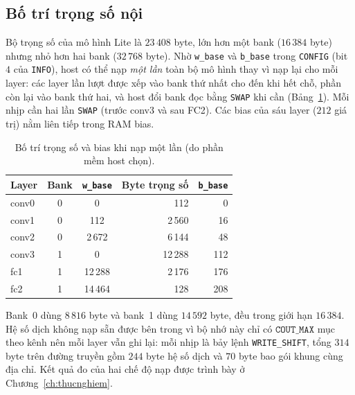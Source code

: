 \subsection{Bố trí trọng số nội}
Bộ trọng số của mô hình Lite là $23\,408$ byte, lớn hơn một bank ($16\,384$ byte) nhưng nhỏ hơn hai bank ($32\,768$ byte).
Nhờ \texttt{w\_base} và \texttt{b\_base} trong \texttt{CONFIG} (bit $4$ của \texttt{INFO}), host có thể nạp \emph{một lần} toàn bộ mô hình thay vì nạp lại cho mỗi layer: các layer lần lượt được xếp vào bank thứ nhất cho đến khi hết chỗ, phần còn lại vào bank thứ hai, và host đổi bank đọc bằng \texttt{SWAP} khi cần (Bảng~\ref{tab:thuongtru}).
Mỗi nhịp cần hai lần \texttt{SWAP} (trước conv3 và sau FC2).
Các bias của sáu layer ($212$ giá trị) nằm liên tiếp trong RAM bias.

\begin{table}[htbp]\centering
\caption{Bố trí trọng số và bias khi nạp một lần (do phần mềm host chọn).}\label{tab:thuongtru}
\small
\begin{tabular}{@{}lccrr@{}}
\toprule
Layer & Bank & \texttt{w\_base} & Byte trọng số & \texttt{b\_base} \\ \midrule
conv0 & 0 & 0 & 112 & 0 \\
conv1 & 0 & 112 & 2\,560 & 16 \\
conv2 & 0 & 2\,672 & 6\,144 & 48 \\
conv3 & 1 & 0 & 12\,288 & 112 \\
fc1 & 1 & 12\,288 & 2\,176 & 176 \\
fc2 & 1 & 14\,464 & 128 & 208 \\ \bottomrule
\end{tabular}
\end{table}

Bank~0 dùng $8\,816$ byte và bank~1 dùng $14\,592$ byte, đều trong giới hạn $16\,384$.
Hệ số dịch không nạp sẵn được bên trong vì bộ nhớ này chỉ có $\texttt{COUT\_MAX}$ mục theo kênh nên mỗi layer vẫn ghi lại: mỗi nhịp là bảy lệnh \texttt{WRITE\_SHIFT}, tổng $314$ byte trên đường truyền gồm $244$ byte hệ số dịch và $70$ byte bao gói khung cùng địa chỉ.
Kết quả đo của hai chế độ nạp được trình bày ở Chương~\ref{ch:thucnghiem}.
